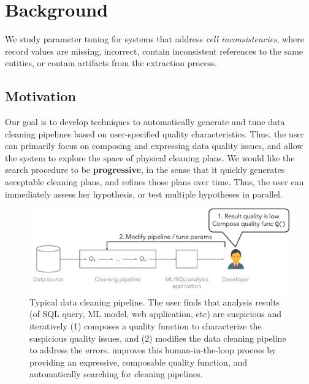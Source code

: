 \section{Background}\label{s:background}
We study parameter tuning for systems that address \emph{cell inconsistencies}, where record values are missing, incorrect, contain inconsistent references to the same entities, or contain artifacts from the extraction process. 

\subsection{Motivation}
Our goal is to develop techniques to automatically generate and tune data cleaning pipelines based on user-specified quality characteristics.  Thus, the user can primarily focus on composing and expressing data quality issues, and allow the system to explore the space of physical cleaning plans.  We would like the search procedure to be \textbf{progressive}, in the sense that it quickly generates acceptable cleaning plans, and refines those plans over time.  Thus, the user can immediately assess her hypothesis, or test multiple hypotheses in parallel.


\begin{figure}[t]
  \centering
 \includegraphics[width=\columnwidth]{figures/user-pipeline}
 \caption{\small Typical data cleaning pipeline.  The user finds that analysis results (of SQL query, ML model, web application, etc) are suspicious and iteratively (1) composes a quality function to characterize the suspicious quality issues, and (2) modifies the data cleaning pipeline to address the errors.  \sys improves this human-in-the-loop process by providing an expressive, composable quality function, and automatically searching for cleaning pipelines.  \label{fig:user-pipeline}}
\end{figure}

